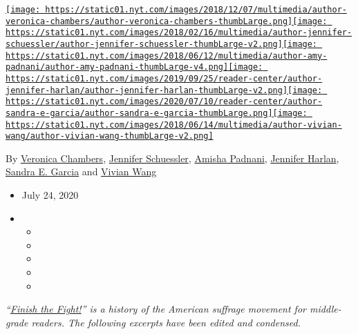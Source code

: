 \href{https://www.nytimes.com/by/veronica-chambers}{\texttt{[image: https://static01.nyt.com/images/2018/12/07/multimedia/author-veronica-chambers/author-veronica-chambers-thumbLarge.png]}}\href{https://www.nytimes.com/by/jennifer-schuessler}{\texttt{[image: https://static01.nyt.com/images/2018/02/16/multimedia/author-jennifer-schuessler/author-jennifer-schuessler-thumbLarge-v2.png]}}\href{https://www.nytimes.com/by/amisha-padnani}{\texttt{[image: https://static01.nyt.com/images/2018/06/12/multimedia/author-amy-padnani/author-amy-padnani-thumbLarge-v4.png]}}\href{https://www.nytimes.com/by/jennifer-harlan}{\texttt{[image: https://static01.nyt.com/images/2019/09/25/reader-center/author-jennifer-harlan/author-jennifer-harlan-thumbLarge-v2.png]}}\href{https://www.nytimes.com/by/sandra-e-garcia}{\texttt{[image: https://static01.nyt.com/images/2020/07/10/reader-center/author-sandra-e-garcia/author-sandra-e-garcia-thumbLarge.png]}}\href{https://www.nytimes.com/by/vivian-wang}{\texttt{[image: https://static01.nyt.com/images/2018/06/14/multimedia/author-vivian-wang/author-vivian-wang-thumbLarge-v2.png]}}

By \href{https://www.nytimes.com/by/veronica-chambers}{Veronica
Chambers},
\href{https://www.nytimes.com/by/jennifer-schuessler}{Jennifer
Schuessler}, \href{https://www.nytimes.com/by/amisha-padnani}{Amisha
Padnani}, \href{https://www.nytimes.com/by/jennifer-harlan}{Jennifer
Harlan}, \href{https://www.nytimes.com/by/sandra-e-garcia}{Sandra E.
Garcia} and \href{https://www.nytimes.com/by/vivian-wang}{Vivian Wang}

\begin{itemize}
\item
  July 24, 2020
\item
  \begin{itemize}
  \item
  \item
  \item
  \item
  \item
  \end{itemize}
\end{itemize}

\emph{``}\href{https://www.nytco.com/press/hmh-books-media-and-the-new-york-times-collaborate-on-nonfiction-project-highlighting-the-diverse-women-who-fought-for-voting-rights/}{\emph{Finish
the Fight!}}\emph{'' is a history of the American suffrage movement for
middle-grade readers. The following excerpts have been edited and
condensed.}

